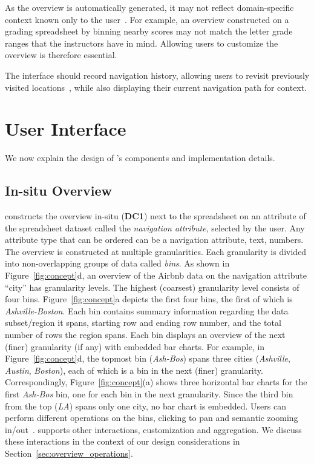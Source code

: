 As the overview is automatically generated,
it may not reflect domain-specific context
known only to the user~\cite{Raman99scalablespreadsheets}.
For example, an overview constructed on a grading
spreadsheet by binning nearby scores
may not match the letter grade ranges
that the instructors have in mind.
Allowing users to customize the overview is therefore essential.

The interface should record navigation history,
allowing users to revisit previously visited locations~\cite{shneiderman2003eyes},
while also displaying their current navigation path for context.

\section{User Interface}
\label{sec:ui}
We now explain the design of \noah's components
and implementation details.

\subsection{In-situ Overview}

\noah constructs the overview in-situ ({\bf DC1})
next to the spreadsheet
on an attribute of the spreadsheet dataset
called the {\em navigation attribute},
selected by the user.
Any attribute type that can be ordered
can be a navigation attribute, \eg
text, numbers.
The overview is constructed at multiple granularities.
Each granularity is divided into non-overlapping
groups of data called {\em bins}.
As shown in Figure~\ref{fig:concept}d,
an overview of the Airbnb data
on the navigation attribute ``city''
has granularity levels.
The highest (coarsest) granularity level
consists of four bins.
Figure~\ref{fig:concept}a
depicts the first four bins,
the first of which is {\em Ashville-Boston}.
Each bin contains summary information
regarding the data subset/region
it spans, \eg starting row and
ending row number, and 
the total number of rows the region spans.
Each bin displays an overview
of the next (finer) granularity (if any)
with embedded bar charts.
For example, in Figure~\ref{fig:concept}d,
the topmost bin ({\em Ash-Bos}) spans three cities
({\em Ashville}, {\em Austin}, {\em Boston}), each of which is a bin
in the next (finer) granularity.
Correspondingly, Figure~\ref{fig:concept}(a)
shows three horizontal bar charts for the
first {\em Ash-Bos} bin,
one for each bin in the next granularity.
Since the third bin from the top
(\emph{LA}) spans only one city,
no bar chart is embedded.
Users can perform different
operations on the bins, \eg clicking to pan and
semantic zooming in/out~\cite{perlin1993pad}.
\noah supports other interactions,
\eg customization and aggregation.
We discuss these interactions
in the context of our design considerations in Section~\ref{sec:overview_operations}.

